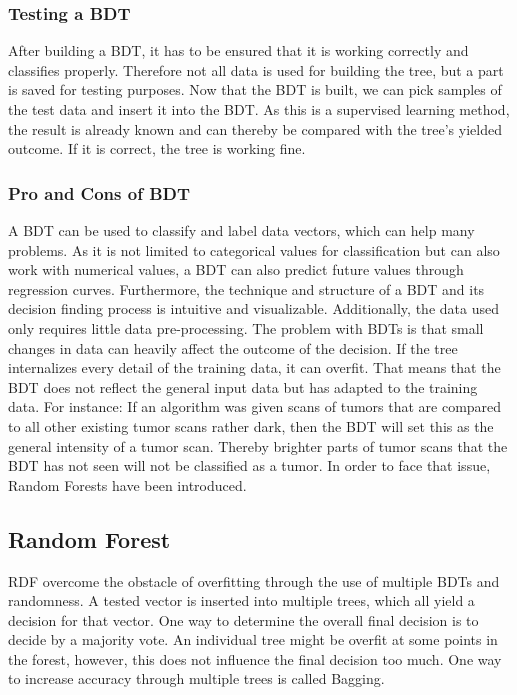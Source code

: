 \documentclass[
12pt,
headsepline,
bibliography=totoc,
twoside=semi,
fleqn
]{scrartcl}
\begin{document}
 \subsubsection{Testing a BDT\label{sec:sec2-1-4}}
 After building a BDT, it has to be ensured that it is working correctly and classifies properly. Therefore not all data is used for building the tree, but a part is saved for testing purposes. Now that the BDT is built, we can pick samples of the test data and insert it into the BDT. As this is a supervised learning method, the result is already known and can thereby be compared with the tree's yielded outcome. If it is correct, the tree is working fine.  

 \subsubsection{Pro and Cons of BDT\label{sec:sec2-1-5}}
 A BDT can be used to classify and label data vectors, which can help many problems. As it is not limited to categorical values for classification but can also work with numerical values, a BDT can also predict future values through regression curves. Furthermore, the technique and structure of a BDT and its decision finding process is intuitive and visualizable. Additionally, the data used only requires little data pre-processing. The problem with BDTs is that small changes in data can heavily affect the outcome of the decision. If the tree internalizes every detail of the training data, it can overfit. That means that the BDT does not reflect the general input data but has adapted to the training data. For instance: If an algorithm was given scans of tumors that are compared to all other existing tumor scans rather dark, then the BDT will set this as the general intensity of a tumor scan. Thereby brighter parts of tumor scans that the BDT has not seen will not be classified as a tumor. In order to face that issue, Random Forests have been introduced. 

 \subsection{Random Forest\label{sec:sec2-2}}
   RDF overcome the obstacle of overfitting through the use of multiple BDTs and randomness. A tested vector is inserted into multiple trees, which all yield a decision for that vector. One way to determine the overall final decision is to decide by a majority vote. An individual tree might be overfit at some points in the forest, however, this does not influence the final decision too much. One way to increase accuracy through multiple trees is called Bagging.
\end{document}
